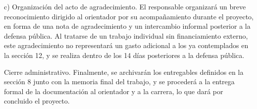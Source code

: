 \documentclass[
11pt, %
]{charter}
\begin{document}
	c) Organización del acto de agradecimiento. El responsable organizará un breve reconocimiento dirigido al orientador por su acompañamiento durante el proyecto, en forma de una nota de agradecimiento y un intercambio informal posterior a la defensa pública. Al tratarse de un trabajo individual sin financiamiento externo, este agradecimiento no representará un gasto adicional a los ya contemplados en la sección 12, y se realiza dentro de los 14 días posteriores a la defensa pública.
	
	Cierre administrativo. Finalmente, se archivarán los entregables definidos en la sección 8 junto con la memoria final del trabajo, y se procederá a la entrega formal de la documentación al orientador y a la carrera, lo que dará por concluido el proyecto.
	
\end{document}
